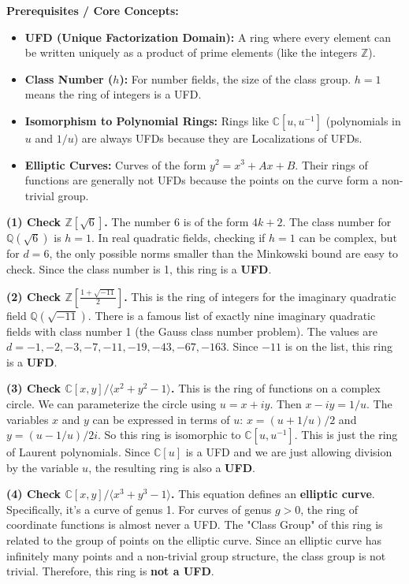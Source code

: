 \begin{solution}
\textbf{Prerequisites / Core Concepts:}
\begin{itemize}
    \item \textbf{UFD (Unique Factorization Domain):} A ring where every element can be written uniquely as a product of prime elements (like the integers $\mathbb{Z}$).
    \item \textbf{Class Number ($h$):} For number fields, the size of the class group. $h=1$ means the ring of integers is a UFD.
    \item \textbf{Isomorphism to Polynomial Rings:} Rings like $\mathbb{C}[u, u^{-1}]$ (polynomials in $u$ and $1/u$) are always UFDs because they are Localizations of UFDs.
    \item \textbf{Elliptic Curves:} Curves of the form $y^2 = x^3 + Ax + B$. Their rings of functions are generally not UFDs because the points on the curve form a non-trivial group.
\end{itemize}

\textbf{(1) Check $\mathbb{Z}[\sqrt{6}]$.}
The number 6 is of the form $4k+2$. The class number for $\mathbb{Q}(\sqrt{6})$ is $h=1$.
In real quadratic fields, checking if $h=1$ can be complex, but for $d=6$, the only possible norms smaller than the Minkowski bound are easy to check.
Since the class number is 1, this ring is a \textbf{UFD}.

\textbf{(2) Check $\mathbb{Z}[\frac{1+\sqrt{-11}}{2}]$.}
This is the ring of integers for the imaginary quadratic field $\mathbb{Q}(\sqrt{-11})$.
There is a famous list of exactly nine imaginary quadratic fields with class number 1 (the Gauss class number problem).
The values are $d = -1, -2, -3, -7, -11, -19, -43, -67, -163$.
Since $-11$ is on the list, this ring is a \textbf{UFD}.

\textbf{(3) Check $\mathbb{C}[x, y] / \langle x^2 + y^2 - 1 \rangle$.}
This is the ring of functions on a complex circle.
We can parameterize the circle using $u = x + iy$. Then $x - iy = 1/u$.
The variables $x$ and $y$ can be expressed in terms of $u$: $x = (u + 1/u)/2$ and $y = (u - 1/u)/2i$.
So this ring is isomorphic to $\mathbb{C}[u, u^{-1}]$.
This is just the ring of Laurent polynomials. Since $\mathbb{C}[u]$ is a UFD and we are just allowing division by the variable $u$, the resulting ring is also a \textbf{UFD}.

\textbf{(4) Check $\mathbb{C}[x, y] / \langle x^3 + y^3 - 1 \rangle$.}
This equation defines an \textbf{elliptic curve}. 
Specifically, it's a curve of genus 1. For curves of genus $g > 0$, the ring of coordinate functions is almost never a UFD.
The "Class Group" of this ring is related to the group of points on the elliptic curve. Since an elliptic curve has infinitely many points and a non-trivial group structure, the class group is not trivial.
Therefore, this ring is \textbf{not a UFD}.
\end{solution}

